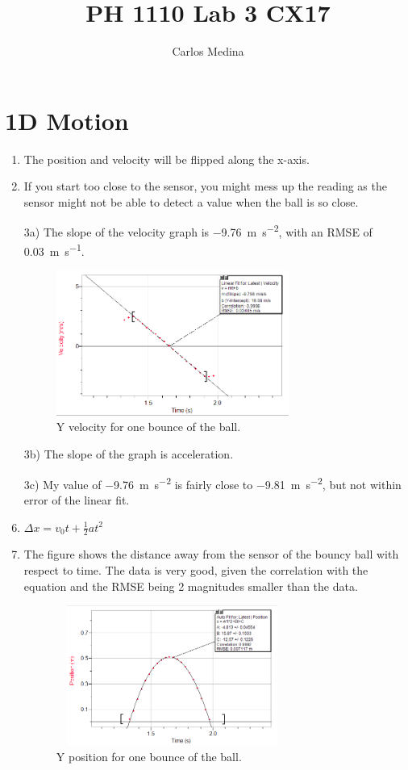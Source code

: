 \documentclass[12pt]{article}
\title{PH 1110 Lab 3 CX17}
\author{Carlos Medina}
\begin{document}
    \maketitle


    \section{1D Motion}
    \begin{enumerate}
        [1), wide=0pt, widest=99,leftmargin=\parindent, labelsep=*]
        \item The position and velocity will be flipped along the x-axis.
        \item If you start too close to the sensor, you might mess up the reading as the sensor might not be able to detect a value when the ball is so close.
        \item [3a)] The slope of the velocity graph is \SI{-9.76}{\meter\per\second\squared}, with an RMSE of \SI{0.03}{\meter\per\second}.
        \begin{figure}[H]
            \centering
            \includegraphics[width=3in]{1d_velo}
            \caption{Y velocity for one bounce of the ball.}
            \label{fig:1d_velo}
        \end{figure}
        \item [3b)] The slope of the graph is acceleration.
        \item [3c)] My value of \SI{-9.76}{\meter\per\second\squared} is fairly close to \SI{-9.81}{\meter\per\second\squared}, but not within error of the linear fit.
        \setcounter{enumi}{3}
        \item \displaystyle\(\Delta x = v_0 t + \frac{1}{2} a t^2\)
        \item The figure shows the distance away from the sensor of the bouncy ball with respect to time.
        The data is very good, given the correlation with the equation and the RMSE being 2 magnitudes smaller than the data.
        \begin{figure}[H]
            \centering
            \includegraphics[width=3in,height=1.8in]{1d_pos}
            \caption{Y position for one bounce of the ball.}
            \label{fig:1d_pos}
        \end{figure}
    \end{enumerate}
\end{document}
